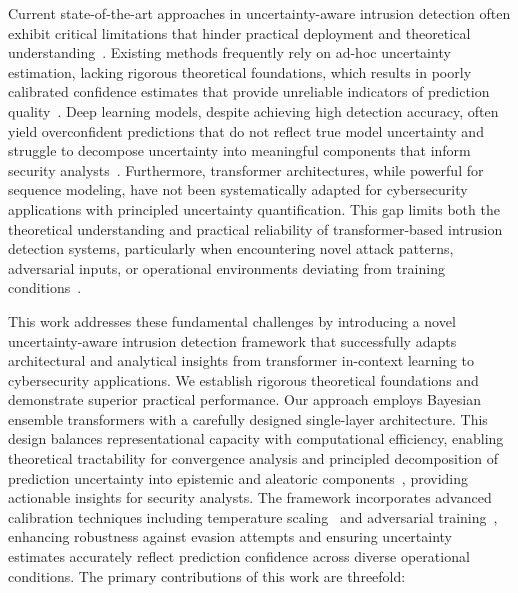 \documentclass[journal]{IEEEtran}
\begin{document}
Current state-of-the-art approaches in uncertainty-aware intrusion detection often exhibit critical limitations that hinder practical deployment and theoretical understanding~\cite{lakshminarayanan2017simple}. Existing methods frequently rely on ad-hoc uncertainty estimation, lacking rigorous theoretical foundations, which results in poorly calibrated confidence estimates that provide unreliable indicators of prediction quality~\cite{guo2017calibration}. Deep learning models, despite achieving high detection accuracy, often yield overconfident predictions that do not reflect true model uncertainty and struggle to decompose uncertainty into meaningful components that inform security analysts~\cite{ovadia2019can}. Furthermore, transformer architectures, while powerful for sequence modeling, have not been systematically adapted for cybersecurity applications with principled uncertainty quantification. This gap limits both the theoretical understanding and practical reliability of transformer-based intrusion detection systems, particularly when encountering novel attack patterns, adversarial inputs, or operational environments deviating from training conditions~\cite{neyshabur2017exploring}.

This work addresses these fundamental challenges by introducing a novel uncertainty-aware intrusion detection framework that successfully adapts architectural and analytical insights from transformer in-context learning to cybersecurity applications. We establish rigorous theoretical foundations and demonstrate superior practical performance. Our approach employs Bayesian ensemble transformers with a carefully designed single-layer architecture. This design balances representational capacity with computational efficiency, enabling theoretical tractability for convergence analysis and principled decomposition of prediction uncertainty into epistemic and aleatoric components~\cite{fort2019deep,kendall2017uncertainties}, providing actionable insights for security analysts. The framework incorporates advanced calibration techniques including temperature scaling~\cite{guo2017calibration} and adversarial training~\cite{madry2017towards}, enhancing robustness against evasion attempts and ensuring uncertainty estimates accurately reflect prediction confidence across diverse operational conditions. The primary contributions of this work are threefold:
\end{document}

